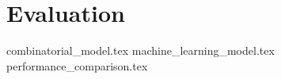 \chapter{Evaluation}

{combinatorial_model.tex}
{machine_learning_model.tex}
{performance_comparison.tex}

